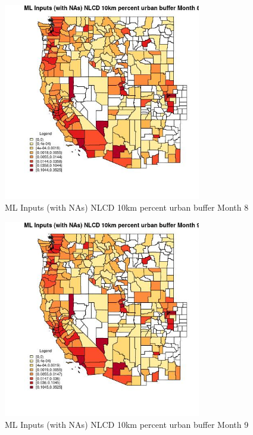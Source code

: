 \begin{figure} 
\centering  
\includegraphics[width=0.77\textwidth]{Code_Outputs/Report_ML_input_PM25_Step4_part_f_de_duplicated_aveswNAs_CountyNLCD_10km_percent_urban_buffermedianMonth8.jpg} 
\caption{\label{fig:Report_ML_input_PM25_Step4_part_f_de_duplicated_aveswNAsCountyNLCD_10km_percent_urban_buffermedianMonth8}ML Inputs (with NAs) NLCD 10km percent urban buffer Month 8} 
\end{figure} 
 

\begin{figure} 
\centering  
\includegraphics[width=0.77\textwidth]{Code_Outputs/Report_ML_input_PM25_Step4_part_f_de_duplicated_aveswNAs_CountyNLCD_10km_percent_urban_buffermedianMonth9.jpg} 
\caption{\label{fig:Report_ML_input_PM25_Step4_part_f_de_duplicated_aveswNAsCountyNLCD_10km_percent_urban_buffermedianMonth9}ML Inputs (with NAs) NLCD 10km percent urban buffer Month 9} 
\end{figure} 
 

